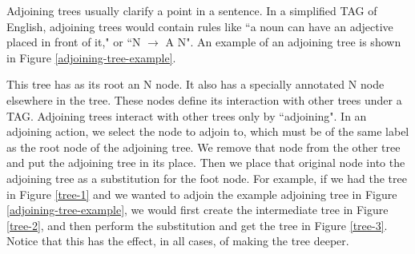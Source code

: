 Adjoining trees usually clarify a point in a sentence.  In a simplified TAG of English, adjoining
trees would contain rules like ``a noun can have an adjective placed in front of it," or ``N $\rightarrow$ A N".
An example of an adjoining tree is shown in Figure \ref{adjoining-tree-example}.

This tree has as its root an N node.  It also has a specially annotated N node elsewhere in the
tree.  These nodes define its interaction with other trees under a TAG.  Adjoining trees interact
with other trees only by ``adjoining".  In an adjoining action, we select the node
to adjoin to, which must be of the same label as the root node of the adjoining tree.  We remove
that node from the other tree and put the adjoining tree in its place.  Then
we place that original node into the adjoining tree as a substitution for the foot node.
For example, if we had the tree in Figure \ref{tree-1} and we wanted to adjoin the example adjoining tree
in Figure \ref{adjoining-tree-example}, we would first create the intermediate tree in Figure \ref{tree-2},
and then perform the substitution and get the tree in Figure \ref{tree-3}.  Notice that this has the effect,
in all cases, of making the tree deeper.

